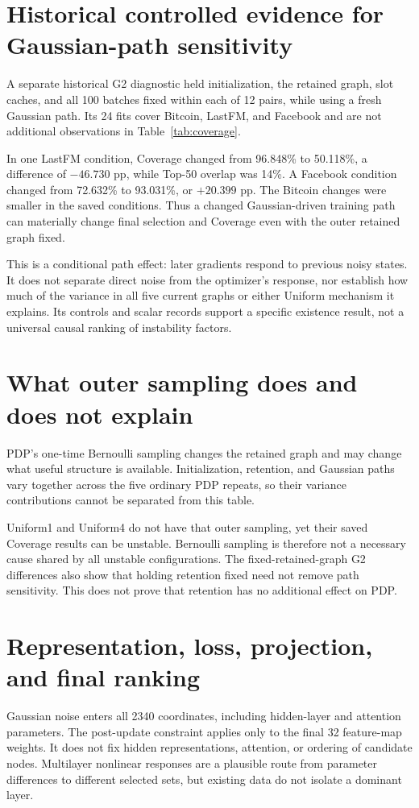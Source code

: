 \section{Historical controlled evidence for Gaussian-path sensitivity}
A separate historical G2 diagnostic held initialization, the retained graph, slot caches, and all 100 batches fixed within each of 12 pairs, while using a fresh Gaussian path. Its 24 fits cover Bitcoin, LastFM, and Facebook and are not additional observations in Table~\ref{tab:coverage}.

In one LastFM condition, Coverage changed from 96.848\% to 50.118\%, a difference of $-46.730$ pp, while Top-50 overlap was 14\%. A Facebook condition changed from 72.632\% to 93.031\%, or $+20.399$ pp. The Bitcoin changes were smaller in the saved conditions. Thus a changed Gaussian-driven training path can materially change final selection and Coverage even with the outer retained graph fixed.

This is a conditional path effect: later gradients respond to previous noisy states. It does not separate direct noise from the optimizer's response, nor establish how much of the variance in all five current graphs or either Uniform mechanism it explains. Its controls and scalar records support a specific existence result, not a universal causal ranking of instability factors.

\section{What outer sampling does and does not explain}
PDP's one-time Bernoulli sampling changes the retained graph and may change what useful structure is available. Initialization, retention, and Gaussian paths vary together across the five ordinary PDP repeats, so their variance contributions cannot be separated from this table.

Uniform1 and Uniform4 do not have that outer sampling, yet their saved Coverage results can be unstable. Bernoulli sampling is therefore not a necessary cause shared by all unstable configurations. The fixed-retained-graph G2 differences also show that holding retention fixed need not remove path sensitivity. This does not prove that retention has no additional effect on PDP.

\section{Representation, loss, projection, and final ranking}
Gaussian noise enters all 2340 coordinates, including hidden-layer and attention parameters. The post-update constraint applies only to the final 32 feature-map weights. It does not fix hidden representations, attention, or ordering of candidate nodes. Multilayer nonlinear responses are a plausible route from parameter differences to different selected sets, but existing data do not isolate a dominant layer.

